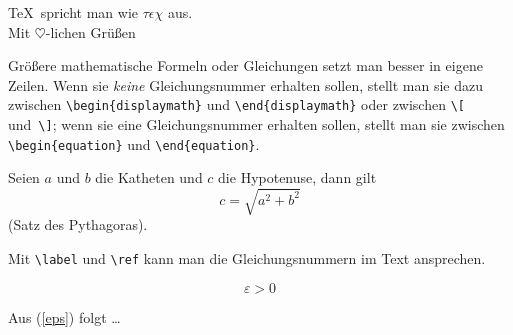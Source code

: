 \begin{LTXexample}
\TeX\ spricht man wie
 $\tau\epsilon\chi$ aus.\\
Mit $\heartsuit$-lichen
 Grü\ss en
\end{LTXexample}

 
Größere mathematische Formeln oder Gleichungen setzt man besser
in eigene Zeilen. Wenn sie \emph{keine} Gleichungsnummer erhalten 
sollen, stellt man sie dazu zwischen \lstinline|\begin{displaymath}| und
\lstinline|\end{displaymath}| oder zwischen \lstinline|\[| und~\lstinline|\]|; 
wenn sie eine Gleichungsnummer erhalten sollen, stellt man sie
zwischen \lstinline|\begin{equation}| und \lstinline|\end{equation}|.

\begin{LTXexample}
Seien $a$ und $b$ die Katheten
und $c$ die Hypotenuse,
dann gilt
\begin{equation}
c = \sqrt{  a^{2}+b^{2}  }
\end{equation}
(Satz des Pythagoras).
\end{LTXexample}


Mit \lstinline|\label| und \lstinline|\ref| kann man die Gleichungsnummern
im Text ansprechen.

\let\origlabel\label
\begin{LTXexample}[preset=\let\label\origlabel]
\begin{equation} \label{eps}
\varepsilon > 0
\end{equation}
 
Aus (\ref{eps}) folgt \dots
\end{LTXexample}

 
 
